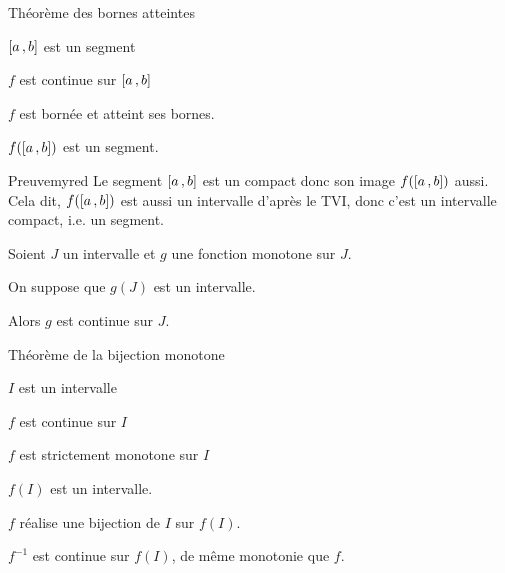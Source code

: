     \begin{theo}{Théorème des bornes atteintes}{}
        \begin{suppose}
            \item $\left[ a \, , b \right]$ est un segment
            \item $f$ est continue sur $\left[ a \, , b \right]$
        \end{suppose}
        \begin{alors}
            \item $f$ est bornée et atteint ses bornes. 
            \item $f(\left[ a \, , b \right])$ est un segment.
        \end{alors}
    \end{theo}

    \begin{demo}{Preuve}{myred}
        Le segment $\left[ a \, , b \right]$ est un compact donc son image $f(\left[ a \, , b \right])$ aussi. Cela dit, $f(\left[ a \, , b \right])$ est aussi un intervalle d’après le TVI, donc c’est un intervalle compact, i.e. un segment.
    \end{demo}

    \begin{lem}{}{}
        Soient $J$ un intervalle et $g$ une fonction monotone sur $J$.

        On suppose que $g(J)$ est un intervalle.

        Alors $g$ est continue sur $J$.
    \end{lem}

    \begin{theo}{Théorème de la bijection monotone}{}
        \begin{suppose}
            \item $I$ est un intervalle
            \item $f$ est continue sur $I$
            \item $f$ est strictement monotone sur $I$
        \end{suppose}
        \begin{alors}
            \item $f(I)$ est un intervalle.
            \item $f$ réalise une bijection de $I$ sur $f(I)$.
            \item $f^{-1}$ est continue sur $f(I)$, de même monotonie que $f$.
        \end{alors}
    \end{theo}


